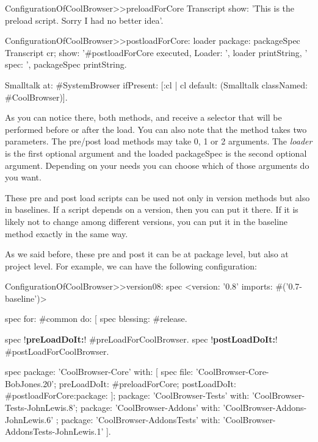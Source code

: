 \documentclass[a4paper,10pt,twoside]{book}
\begin{document}
\begin{code}{}
ConfigurationOfCoolBrowser>>preloadForCore
         Transcript show: 'This is the preload script. Sorry I had no better idea'. 
\end{code}

\begin{code}{}
ConfigurationOfCoolBrowser>>postloadForCore: loader package: packageSpec
       Transcript cr; 
              show: '#postloadForCore executed, Loader: ', loader printString, 
                     ' spec: ', packageSpec printString.
       
       Smalltalk at: #SystemBrowser ifPresent: [:cl | cl default: (Smalltalk classNamed: #CoolBrowser)].
\end{code}

As you can notice there, both methods,  and  receive a selector that will be performed before or after the load. You can also note that the method   takes two parameters. The pre/post load methods may take 0, 1 or 2 arguments. The {\em loader}  is the first optional argument and the loaded packageSpec is the second optional argument. Depending on your needs you can choose which of those arguments do you want.

These pre and post load scripts can be used not only in version methods but also in baselines. If a script depends on a version, then you can put it there. If it is likely not to change among different versions, you can put it in the baseline method exactly in the same way.

As we said before, these pre and post it can be at package level, but also at project level. For example, we can have the following configuration:

\begin{code}{} 
ConfigurationOfCoolBrowser>>version08: spec 
       <version: '0.8' imports: #('0.7-baseline')>
       
       spec for: #common do: [
              spec blessing: #release.
              
              spec !\textbf{preLoadDoIt:}! #preLoadForCoolBrowser.
              spec !\textbf{postLoadDoIt:}! #postLoadForCoolBrowser.
       
              spec 
                     package: 'CoolBrowser-Core' with: [
                            spec 
                                   file: 'CoolBrowser-Core-BobJones.20';
                                   preLoadDoIt: #preloadForCore;
                                   postLoadDoIt: #postloadForCore:package: ];
                     package: 'CoolBrowser-Tests' with: 'CoolBrowser-Tests-JohnLewis.8';
                     package: 'CoolBrowser-Addons' with: 'CoolBrowser-Addons-JohnLewis.6' ;
                     package: 'CoolBrowser-AddonsTests' with: 'CoolBrowser-AddonsTests-JohnLewis.1' ].
\end{code}
\end{document}
